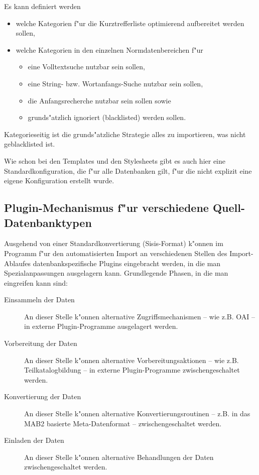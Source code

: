 \documentclass[11pt, twoside, a4paper, BCOR8mm, DIV12, bibtotoc,idxtotoc]{scrbook}
\begin{document}
Es kann definiert werden
\begin{itemize}
\item welche Kategorien f"ur die Kurztrefferliste optimierend
  aufbereitet werden sollen,
\item welche Kategorien in den einzelnen Normdatenbereichen f"ur
  \begin{itemize}
  \item eine Volltextsuche nutzbar sein sollen,
  \item eine String- bzw. Wortanfangs-Suche nutzbar sein sollen,
  \item die Anfangsrecherche nutzbar sein sollen sowie
  \item grunds"atzlich ignoriert (blacklisted) werden sollen.
  \end{itemize}
\end{itemize}

Kategorieseitig ist die grunds"atzliche Strategie alles zu
importieren, was nicht geblacklisted ist.

Wie schon bei den Templates und den Stylesheets gibt es auch hier
eine Standardkonfiguration, die f"ur alle Datenbanken gilt, f"ur die
nicht explizit eine eigene Konfiguration erstellt wurde.

\subsection{Plugin-Mechanismus f"ur verschiedene Quell-Datenbanktypen}
Ausgehend von einer Standardkonvertierung (Sisis-Format) k"onnen im
Programm f"ur den auto\-ma\-ti\-sier\-ten Import an verschiedenen Stellen des
Import-Ablaufes datenbankspezifische Plugins eingebracht werden, in die
man Spezialanpassungen ausgelagern kann. Grundlegende Phasen, in die
man eingreifen kann sind:
\begin{description}
\item[Einsammeln der Daten] An dieser Stelle k"onnen alternative
  Zugriffsmechanismen -- wie z.B. OAI --
  in externe Plugin-Programme ausgelagert werden.
\item[Vorbereitung der Daten] An dieser Stelle k"onnen alternative
  Vorbereitungsaktionen -- wie z.B. Teilkatalogbildung -- in externe
  Plugin-Programme zwischen\-ge\-schal\-tet werden.
\item[Konvertierung der Daten] An dieser Stelle k"onnen alternative
  Konvertierungsroutinen -- z.B. in das MAB2 basierte Meta-Datenformat
  -- zwischen\-ge\-schal\-tet werden.
\item[Einladen der Daten] An dieser Stelle k"onnen alternative
  Behandlungen der Daten zwischen\-ge\-schal\-tet werden.
\end{description}
\end{document}
